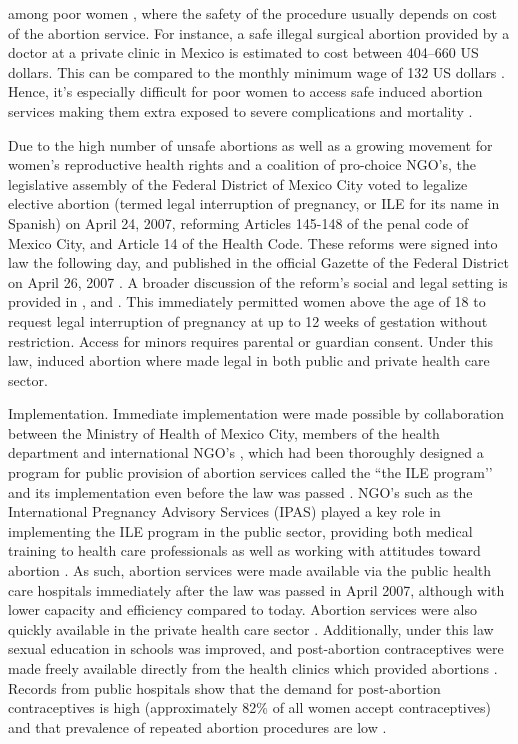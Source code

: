 \documentclass[a4paper,11pt]{article}
\begin{document}
\begin{spacing}{1.5}
among poor women \citep{GIRE2009}, where the safety of the procedure usually depends on cost of the abortion service.  For instance, a safe illegal surgical abortion provided by a doctor at a private clinic in Mexico is estimated to cost between 404–660 US dollars. This can be compared to the monthly minimum wage of 132 US dollars \citep{GIRE2009}. Hence, it’s especially difficult for poor women to access safe induced abortion services making them extra exposed to severe complications and mortality \citep{GIRE2009}.

Due to the high number of unsafe abortions as well as a growing movement for women's reproductive health rights and a coalition of pro-choice NGO’s, the legislative assembly of the Federal District of Mexico City voted to legalize elective abortion (termed legal interruption of pregnancy, or ILE for its name in Spanish) on April 24, 2007, reforming Articles 145-148 of the penal code of Mexico City, and Article 14 of the Health Code.  These reforms were signed into law the following day, and published in the official Gazette of the Federal District on April 26, 2007 \citep{Gacetta2007}.  A broader discussion of the reform's social and legal setting is provided in \citet{Kulczycki2011, Madrazo2009}, \citep{blanco2011implementation} and \citet{Johnson2013}.  This immediately permitted women above the age of 18 to request legal interruption of pregnancy at up to 12 weeks of gestation without restriction.  Access for minors requires parental or guardian consent. Under this law, induced abortion where made legal in both public and private health care sector.

Implementation. Immediate implementation were made possible by collaboration between the Ministry of Health of Mexico City, members of the health department and international NGO’s , which had been thoroughly designed a program for public provision of abortion services called the ``the ILE program’’ and its implementation even before the law was passed \citep{singh2012making}.  NGO’s such as the International Pregnancy Advisory Services (IPAS) played a key role in implementing the ILE program in the public sector, providing both medical training to health care professionals as well as working with attitudes toward abortion \citep{blanco2011implementation}. As such, abortion services were made available via the public health care hospitals immediately after the law was passed in April 2007, although with lower capacity and efficiency compared to today. Abortion services were also quickly available in the private health care sector \citep{blanco2011implementation}.  Additionally, under this law sexual education in schools was improved, and post-abortion contraceptives were made freely available directly from the health clinics which provided abortions \citep{Contreras2011}. Records from public hospitals show that the demand for post-abortion contraceptives is high (approximately 82\% of all women accept contraceptives) and that prevalence of repeated abortion procedures are low \citep{Becker2013}.


\end{spacing}
\end{document}
